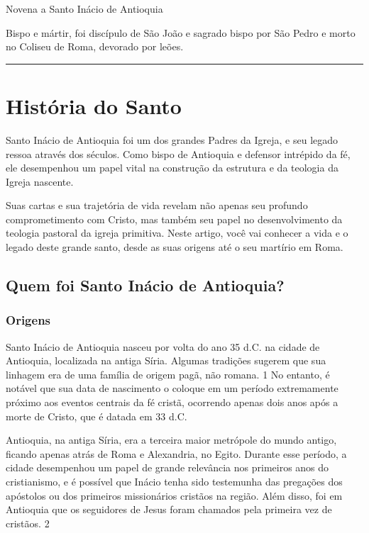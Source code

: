 \documentclass[a4paper,14pt]{extarticle} \usepackage[utf8]{inputenc}
\begin{document}
\begin{center}
  {\huge Novena a Santo Inácio de Antioquia}
\end{center}

Bispo e mártir, foi discípulo de São João e sagrado bispo por São Pedro e morto no Coliseu de Roma, devorado por leões.

\par\noindent\rule{\textwidth}{0.4pt}

\tableofcontents
\thispagestyle{empty}

\newpage

\section{História do Santo}

Santo Inácio de Antioquia foi um dos grandes Padres da Igreja, e seu legado ressoa através dos séculos. Como bispo de Antioquia e defensor intrépido da fé, ele desempenhou um papel vital na construção da estrutura e da teologia da Igreja nascente. 

Suas cartas e sua trajetória de vida revelam não apenas seu profundo comprometimento com Cristo, mas também seu papel no desenvolvimento da teologia pastoral da igreja primitiva. Neste artigo, você vai conhecer a vida e o legado deste grande santo, desde as suas origens até o seu martírio em Roma. 

\subsection{Quem foi Santo Inácio de Antioquia?}
\subsubsection{Origens}

Santo Inácio de Antioquia nasceu por volta do ano 35 d.C. na cidade de Antioquia, localizada na antiga Síria. Algumas tradições sugerem que sua linhagem era de uma família de origem pagã, não romana. 1 No entanto, é notável que sua data de nascimento o coloque em um período extremamente próximo aos eventos centrais da fé cristã, ocorrendo apenas dois anos após a morte de Cristo, que é datada em 33 d.C.

Antioquia, na antiga Síria, era a terceira maior metrópole do mundo antigo, ficando apenas atrás de Roma e Alexandria, no Egito. Durante esse período, a cidade desempenhou um papel de grande relevância nos primeiros anos do cristianismo, e é possível que Inácio tenha sido testemunha das pregações dos apóstolos ou dos primeiros missionários cristãos na região. Além disso, foi em Antioquia que os seguidores de Jesus foram chamados pela primeira vez de cristãos. 2
\end{document}
